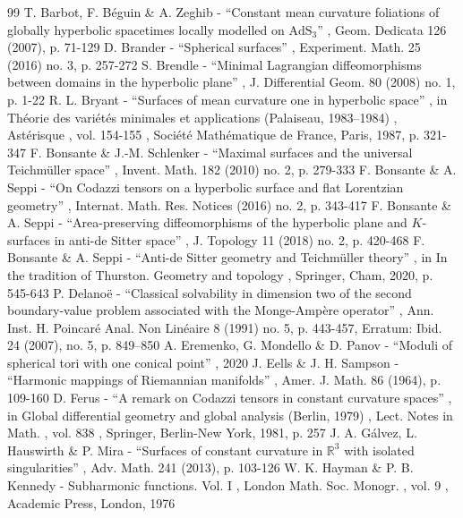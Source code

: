 \documentclass[11pt]{article}
\theoremstyle{definition}
\begin{document}
\begin{thebibliography}{99}
 T. Barbot, F. Béguin \& A. Zeghib - “Constant mean curvature foliations of globally hyperbolic spacetimes locally modelled on $\textrm{AdS}_3$” , Geom. Dedicata 126 (2007), p. 71-129
 D. Brander - “Spherical surfaces” , Experiment. Math. 25 (2016) no. 3, p. 257-272
 S. Brendle - “Minimal Lagrangian diffeomorphisms between domains in the hyperbolic plane” , J. Differential Geom. 80 (2008) no. 1, p. 1-22
 R. L. Bryant - “Surfaces of mean curvature one in hyperbolic space” , in Théorie des variétés minimales et applications (Palaiseau, 1983–1984) , Astérisque , vol. 154-155 , Société Mathématique de France, Paris, 1987, p. 321-347
 F. Bonsante \& J.-M. Schlenker - “Maximal surfaces and the universal Teichmüller space” , Invent. Math. 182 (2010) no. 2, p. 279-333
 F. Bonsante \& A. Seppi - “On Codazzi tensors on a hyperbolic surface and flat Lorentzian geometry” , Internat. Math. Res. Notices (2016) no. 2, p. 343-417
 F. Bonsante \& A. Seppi - “Area-preserving diffeomorphisms of the hyperbolic plane and $K$-surfaces in anti-de Sitter space” , J. Topology 11 (2018) no. 2, p. 420-468
 F. Bonsante \& A. Seppi - “Anti-de Sitter geometry and Teichmüller theory” , in In the tradition of Thurston. Geometry and topology , Springer, Cham, 2020, p. 545-643
 P. Delanoë - “Classical solvability in dimension two of the second boundary-value problem associated with the Monge-Ampère operator” , Ann. Inst. H. Poincaré Anal. Non Linéaire 8 (1991) no. 5, p. 443-457, Erratum: Ibid. 24 (2007), no. 5, p. 849–850
 A. Eremenko, G. Mondello \& D. Panov - “Moduli of spherical tori with one conical point” , 2020
 J. Eells \& J. H. Sampson - “Harmonic mappings of Riemannian manifolds” , Amer. J. Math. 86 (1964), p. 109-160
 D. Ferus - “A remark on Codazzi tensors in constant curvature spaces” , in Global differential geometry and global analysis (Berlin, 1979) , Lect. Notes in Math. , vol. 838 , Springer, Berlin-New York, 1981, p. 257
 J. A. Gálvez, L. Hauswirth \& P. Mira - “Surfaces of constant curvature in $\mathbb{R}^3$ with isolated singularities” , Adv. Math. 241 (2013), p. 103-126
 W. K. Hayman \& P. B. Kennedy - Subharmonic functions. Vol. I , London Math. Soc. Monogr. , vol. 9 , Academic Press, London, 1976

\end{thebibliography}
\end{document}

